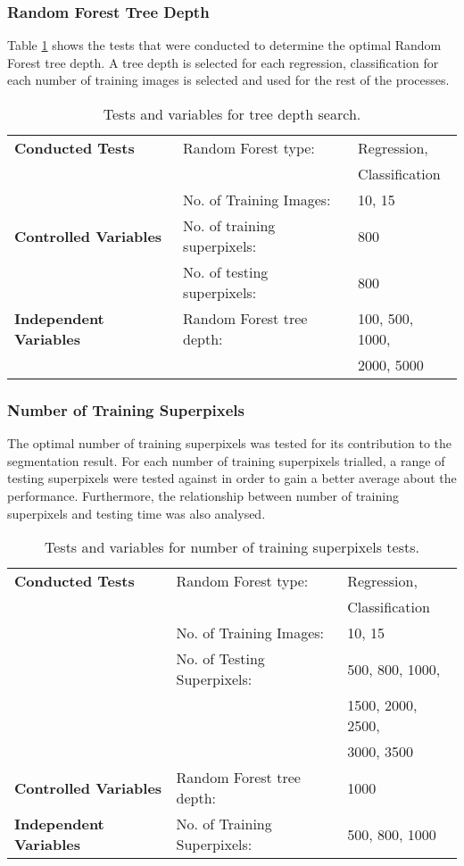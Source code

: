 \subsubsection{Random Forest Tree Depth}
Table \ref{table:treedepth} shows the tests that were conducted to determine the optimal Random Forest tree depth. A tree depth is selected for each regression, classification for each number of training images is selected and used for the rest of the processes.

\begin{table}[H]
\centering
\caption{Tests and variables for tree depth search.}

\begin{tabular}{|l|ll|}
\hline
\textbf{Conducted Tests}	& Random Forest type: & Regression,\\
	& 	& Classification\\		
	&  No. of Training Images: & 10, 15\\
\hline
\textbf{Controlled Variables} & No. of training superpixels: & 800 \\
	& No. of testing superpixels: & 800\\
\hline
\textbf{Independent Variables} & Random Forest tree depth: & 100, 500, 1000,\\
	& 	& 2000, 5000\\
\hline				    	 			   			    	 
\end{tabular}
\label{table:treedepth}
\end{table}

\subsubsection{Number of Training Superpixels}
The optimal number of training superpixels was tested for its contribution to the segmentation result. For each number of training superpixels trialled, a range of testing superpixels were tested against in order to gain a better average about the performance. Furthermore, the relationship between number of training superpixels and testing time was also analysed. 

\begin{table}[H]
\centering
\caption{Tests and variables for number of training superpixels tests.}

\begin{tabular}{|l|ll|}
\hline
\textbf{Conducted Tests}	& Random Forest type: & Regression,\\
	& 	& Classification\\		
	&  No. of Training Images: & 10, 15\\
	& No. of Testing Superpixels: & 500, 800, 1000,\\
	& 	& 1500, 2000, 2500, \\ 
	&	& 3000, 3500\\
\hline
\textbf{Controlled Variables} & Random Forest tree depth: & 1000 \\
\hline
\textbf{Independent Variables} & No. of Training Superpixels: & 500, 800, 1000\\
\hline				    	 			   			    	 
\end{tabular}
\label{table:trainpix}
\end{table}



